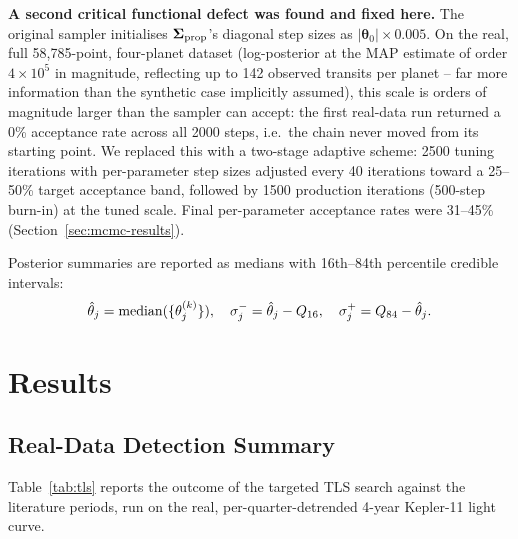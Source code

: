 \documentclass[11pt]{article}
\begin{document}
\textbf{A second critical functional defect was found and fixed here.} The original sampler initialises $\boldsymbol\Sigma_{\rm prop}$'s diagonal step sizes as $|\boldsymbol\theta_0|\times 0.005$. On the real, full 58{,}785-point, four-planet dataset (log-posterior at the MAP estimate of order $4\times10^5$ in magnitude, reflecting up to 142 observed transits per planet -- far more information than the synthetic case implicitly assumed), this scale is orders of magnitude larger than the sampler can accept: the first real-data run returned a 0\% acceptance rate across all 2000 steps, i.e.\ the chain never moved from its starting point. We replaced this with a two-stage adaptive scheme: 2500 tuning iterations with per-parameter step sizes adjusted every 40 iterations toward a 25--50\% target acceptance band, followed by 1500 production iterations (500-step burn-in) at the tuned scale. Final per-parameter acceptance rates were 31--45\% (Section~\ref{sec:mcmc-results}).

Posterior summaries are reported as medians with 16th--84th percentile credible intervals:
\begin{equation}
\hat\theta_j = {\rm median}(\{\theta_j^{(k)}\}), \quad \sigma_j^- = \hat\theta_j - Q_{16}, \quad \sigma_j^+ = Q_{84} - \hat\theta_j.
\label{eq:posterior}
\end{equation}

\section{Results}

\subsection{Real-Data Detection Summary}
\label{sec:results-detection}

Table~\ref{tab:tls} reports the outcome of the targeted TLS search against the literature periods, run on the real, per-quarter-detrended 4-year Kepler-11 light curve.
\end{document}
